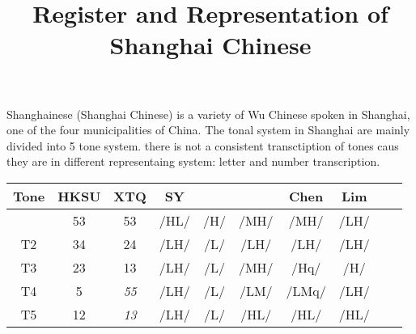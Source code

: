 \documentclass[11pt]{article}
\title{Register and Representation of Shanghai Chinese}
\begin{document}
\maketitle

Shanghainese (Shanghai Chinese) is a variety of Wu Chinese spoken in Shanghai, one of the four municipalities of China. 
The tonal system in Shanghai are mainly divided into 5 tone system. there is not a consistent transctiption of tones caus they are in different representaing system: letter and number transcription. 

\begin{table}[htbp]
	\centering
	\begin{tabular}{cccccccccc}
		\toprule
		\textbf{Tone} & HKSU &XTQ& SY  & \citet{duanmu1999metrical} &  \citet{zee1979tones}  & Chen  & Lim  &  \\ \midrule
		     \cellcolor{gray}{T1}       &   53   & 53&/HL/ &  /H/   & /MH/ & /MH/  & /LH/ &  \\
		     T2       &   34   & 24&/LH/ &  /L/   & /LH/ & /LH/  & /LH/ &  \\
		     T3       &   23   & 13&/LH/ &  /L/   & /MH/ & /Hq/  & /H/  &  \\
		     T4       &   5    & \emph{55}&/LH/ &  /L/   & /LM/ & /LMq/ & /LH/ &  \\
		     T5       &   12   & \emph{13}&/LH/ &  /L/   & /HL/ & /HL/  & /HL/ &  \\ \bottomrule
	\end{tabular}
\end{table}
\end{document}

